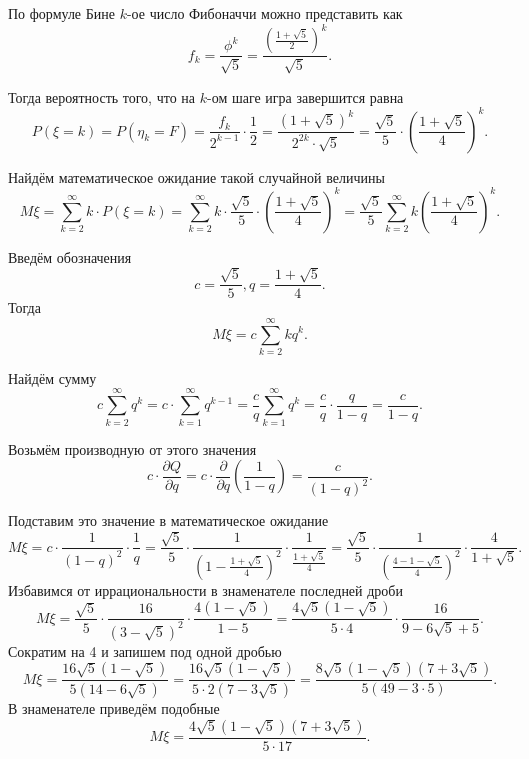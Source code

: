 По формуле Бине $k$-ое число Фибоначчи можно представить как
$$f_k =
\frac{ \phi^k}{ \sqrt{5}} =
\frac{ \left( \frac{1 + \sqrt{5}}{2} \right)^k}{ \sqrt{5}}.$$

Тогда вероятность того, что на $k$-ом шаге игра завершится равна
$$P \left( \xi = k \right) =
P \left( \eta_k = F \right) =
\frac{f_k}{2^{k-1}} \cdot \frac{1}{2} =
\frac{ \left( 1 + \sqrt{5} \right)^k}{2^{2k} \cdot \sqrt{5}} =
\frac{ \sqrt{5}}{5} \cdot \left( \frac{1 + \sqrt{5}}{4} \right)^k.$$

Найдём математическое ожидание такой случайной величины
$$M \xi =
\sum \limits_{k=2}^{ \infty } k \cdot P \left( \xi = k \right) =
\sum \limits_{k=2}^{ \infty } k \cdot \frac{ \sqrt{5}}{5} \cdot \left( \frac{1 + \sqrt{5}}{4} \right)^k =
\frac{ \sqrt{5}}{5} \sum \limits_{k=2}^{ \infty } k \left( \frac{1 + \sqrt{5}}{4} \right)^k.$$

Введём обозначения
$$ c = \frac{ \sqrt{5}}{5}, q = \frac{1 + \sqrt{5}}{4}.$$
Тогда
$$M \xi =
c \sum \limits_{k=2}^{ \infty } kq^{k}.$$

Найдём сумму
$$c \sum \limits_{k=2}^{ \infty } q^k =
c \cdot \sum \limits_{k=1}^{ \infty } q^{k-1} =
\frac{c}{q} \sum \limits_{k=1}^{ \infty } q^{k} =
\frac{c}{q} \cdot \frac{q}{1-q} =
\frac{c}{1-q}.$$

Возьмём производную от этого значения
$$c \cdot \frac{ \partial Q}{ \partial q} =
c \cdot \frac{ \partial }{ \partial q} \left( \frac{1}{1-q} \right) =
\frac{c}{ \left( 1-q \right)^2}.$$

Подставим это значение в математическое ожидание
$$M \xi =
c \cdot \frac{1}{ \left( 1-q \right)^2} \cdot \frac{1}{q} =
\frac{ \sqrt{5}}{5} \cdot \frac{1}{ \left( 1 - \frac{1 + \sqrt{5}}{4} \right)^2} \cdot \frac{1}{ \frac{1 + \sqrt{5}}{4}} =
\frac{ \sqrt{5}}{5} \cdot \frac{1}{ \left( \frac{4 - 1 - \sqrt{5}}{4} \right)^2} \cdot \frac{4}{1 + \sqrt{5}}.$$
Избавимся от иррациональности в знаменателе последней дроби
$$M \xi =
\frac{ \sqrt{5}}{5} \cdot \frac{16}{ \left( 3 - \sqrt{5} \right)^2} \cdot \frac{4 \left( 1 - \sqrt{5} \right)}{1 - 5} =
\frac{4 \sqrt{5} \left( 1 - \sqrt{5} \right) }{5 \cdot 4} \cdot \frac{16}{9 - 6 \sqrt{5} + 5}.$$
Сократим на 4 и запишем под одной дробью
$$M \xi =
\frac{16 \sqrt{5} \left( 1 - \sqrt{5} \right) }{5 \left( 14 - 6 \sqrt{5} \right) } =
\frac{16 \sqrt{5} \left( 1 - \sqrt{5} \right) }{5 \cdot 2 \left( 7 - 3 \sqrt{5} \right)} =
\frac{8 \sqrt{5} \left( 1 - \sqrt{5} \right) \left( 7 + 3 \sqrt{5} \right) }{5 \left( 49 - 3 \cdot 5 \right) }.$$
В знаменателе приведём подобные
$$M \xi = \frac{4 \sqrt{5} \left( 1 - \sqrt{5} \right) \left( 7 + 3 \sqrt{5} \right) }{5 \cdot 17}.$$

